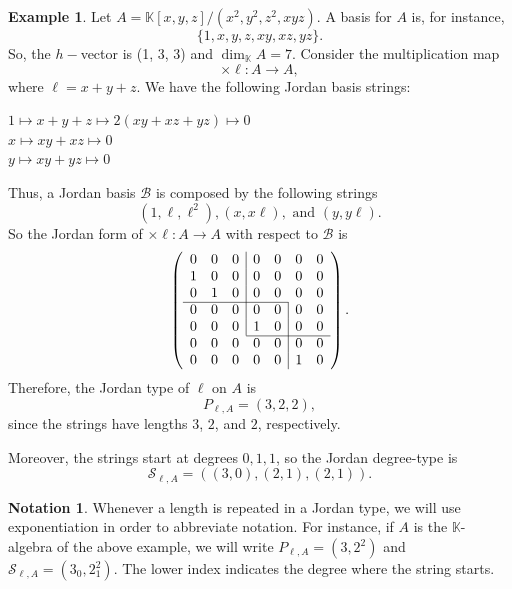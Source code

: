 \documentclass[12pt,twoside]{amsart}
\numberwithin{equation}{section} \hyphenation{semi-stable}
\newcommand{\K}{\mathbb{K}}
\theoremstyle{definition}
\newtheorem{example}[theorem]{Example}
\newtheorem{notation}[theorem]{Notation}
\begin{document}
 \begin{example}
     Let $A = \mathbb{K}[x,y,z]/(x^2, y^2, z^2, xyz)$. A basis for $A$ is, for instance,
$$ \{1, x, y, z, xy, xz, yz\}. $$
So, the $h-$vector is (1, 3, 3) and $\dim_\mathbb{K} A = 7$. Consider the multiplication map
$$ \times \ell : A \to A, $$
where $\ell = x + y + z$. We have the following Jordan basis strings:

\begin{center}
    $1 \longmapsto x+y+z \longmapsto 2(xy+xz+yz) \longmapsto 0$ \\
    \smallskip
    $x\longmapsto xy + xz \longmapsto 0$ \\
    \smallskip
    $y \longmapsto xy + yz \longmapsto 0$
\end{center}

  Thus, a Jordan basis $\mathcal{B}$ is composed by the following strings
    \[
    (1,\ell,\ell^2), (x,x\ell), \text{ and } (y,y\ell).
    \]
    So the Jordan form  of  $\times\ell:A\to A$ with respect to $\mathcal{B}$ is
    \[
    \newcommand{\?}[1]{\multicolumn{1}{c|}{#1}}
    \left(\begin{array}{ccccccc}
    0 & 0 & \?0 & 0 &   0 & 0 & 0 \\
    1 & 0 & \?0 & 0 &   0 & 0 & 0 \\
    0 & 1 & \?0 & 0 &   0 & 0 & 0 \\
    \cline{1-5}
    0 & 0 & \?0 & 0 & \?0 & 0 & 0 \\
    0 & 0 & \?0 & 1 & \?0 & 0 & 0 \\
    \cline{4-7}
    0 & 0 & 0 & 0 & \?0 & 0 & 0 \\
    0 & 0 & 0 & 0 & \?0 & 1 & 0
    \end{array}\right).
    \]    
Therefore, the Jordan type of $\ell$ on $A$ is 
$$
P_{\ell,A} = (3,2,2),
$$
since the strings have lengths $3$, $2$, and $2$, respectively.

Moreover, the strings start at degrees $0,1,1$, so the Jordan degree-type is
$$
\mathcal{S}_{\ell,A} = ((3,0),(2,1),(2,1)).
$$
 \end{example}

 \begin{notation}
    Whenever a length is repeated in a Jordan type, we will use exponentiation in order to abbreviate notation. For instance, if $A$ is the $\K$- algebra of the above  example, we will write $P_{\ell,A}=(3,2^2)$ and 
$\mathcal{S}_{\ell,A}=(3_0,2_1^2)$. The lower index indicates the degree where the string starts.
\end{notation}
\end{document}

